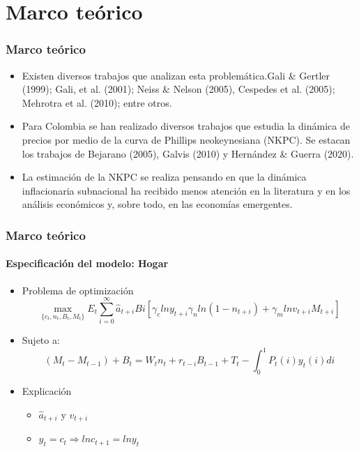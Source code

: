 \documentclass[10pt]{beamer}
\begin{document}

\section{Marco teórico}
\begin{frame}
\frametitle{Marco teórico}
\begin{itemize}
\justifying
\item<1->  Existen diversos trabajos que analizan esta problemática.Gali \& Gertler (1999); Gali, et al. (2001); Neiss \& Nelson (2005), Cespedes et al. (2005);  Mehrotra et al. (2010); entre otros.
\item<2-> Para Colombia se han realizado diversos trabajos que estudia la dinámica de precios por medio de la curva de Phillips neokeynesiana (NKPC). Se estacan los trabajos de Bejarano (2005), Galvis (2010) y Hernández \& Guerra (2020).
\item<3-> La estimación de la NKPC se realiza pensando en que la dinámica inflacionaria subnacional ha recibido menos atención en la literatura y en los análisis económicos y, sobre todo, en las economías emergentes.
 \end{itemize}
\end{frame}



\begin{frame}
\frametitle{Marco teórico}
\framesubtitle{Especificación del modelo: Hogar}
\begin{itemize}
\item<1-> Problema de optimización
\begin{equation*}
\max_{\{c_{t},n_{t},B_{t},M_{t}\}} E_{t} \sum_{i=0}^{\infty}\widehat{a}_{t+i} B{i}
\left[ \gamma_{c} ln y_{t+i} \gamma_{n}ln(1-n_{t+i})+\gamma_{m}ln v_{t+i}M_{t+i} \right] 
\end{equation*}

\item<2-> Sujeto a:
\begin{equation*}
(M_{t}-M_{t-1})+B_{t}=W_{t}n_{t}+r_{t-i}B_{t-1}+T_{t}- \int_{0}^{1} P_{t}(i) y_{t}(i)di
\end{equation*}
\item<3-> Explicación
\begin{itemize}
\item $\widehat{a}_{t+i}$ y $v_{t+i}$
\item $y_{t}=c_{t}\Rightarrow lnc_{t+1}=lny_{t}$
\end{itemize}
\end{itemize}
 \end{frame}
 
\end{document}
